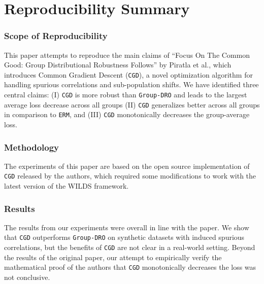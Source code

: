 \section*{\centering Reproducibility Summary}

\subsubsection*{Scope of Reproducibility}

This paper attempts to reproduce the main claims of ``Focus On The Common Good: Group Distributional Robustness Follows'' by Piratla et al., which introduces Common Gradient Descent (\texttt{CGD}), a novel optimization algorithm for handling spurious correlations and sub-population shifts. We have identified three central claims: (I) \texttt{CGD} is more robust than \texttt{Group-DRO} and leads to the largest average loss decrease across all groups (II) \texttt{CGD} generalizes better across all groups in comparison to \texttt{ERM}, and (III) \texttt{CGD} monotonically decreases the group-average loss.

\subsubsection*{Methodology}

The experiments of this paper are based on the open source implementation of \texttt{CGD} released by the authors, which required some modifications to work with the latest version of the WILDS framework.

\subsubsection*{Results}
The results from our experiments were overall in line with the paper.
We show that \texttt{CGD} outperforms \texttt{Group-DRO} on synthetic datasets with induced spurious correlations, but the benefits of \texttt{CGD} are not clear in a real-world setting. Beyond the results of the original paper, our attempt to empirically verify the mathematical proof of the authors that \texttt{CGD} monotonically decreases the loss was not conclusive.


